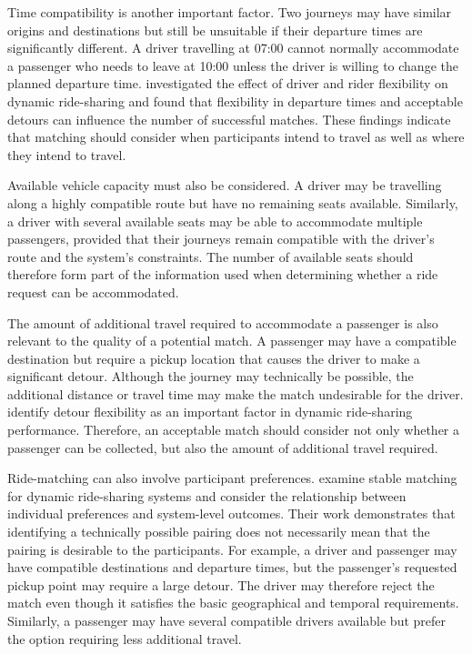 Time compatibility is another important factor. Two journeys may have similar origins and destinations but still be unsuitable if their departure times are significantly different. A driver travelling at 07:00 cannot normally accommodate a passenger who needs to leave at 10:00 unless the driver is willing to change the planned departure time. \citet{stiglic2016} investigated the effect of driver and rider flexibility on dynamic ride-sharing and found that flexibility in departure times and acceptable detours can influence the number of successful matches. These findings indicate that matching should consider when participants intend to travel as well as where they intend to travel.

Available vehicle capacity must also be considered. A driver may be travelling along a highly compatible route but have no remaining seats available. Similarly, a driver with several available seats may be able to accommodate multiple passengers, provided that their journeys remain compatible with the driver's route and the system's constraints. The number of available seats should therefore form part of the information used when determining whether a ride request can be accommodated.

The amount of additional travel required to accommodate a passenger is also relevant to the quality of a potential match. A passenger may have a compatible destination but require a pickup location that causes the driver to make a significant detour. Although the journey may technically be possible, the additional distance or travel time may make the match undesirable for the driver. \citet{stiglic2016} identify detour flexibility as an important factor in dynamic ride-sharing performance. Therefore, an acceptable match should consider not only whether a passenger can be collected, but also the amount of additional travel required.

Ride-matching can also involve participant preferences. \citet{wang2018} examine stable matching for dynamic ride-sharing systems and consider the relationship between individual preferences and system-level outcomes. Their work demonstrates that identifying a technically possible pairing does not necessarily mean that the pairing is desirable to the participants. For example, a driver and passenger may have compatible destinations and departure times, but the passenger's requested pickup point may require a large detour. The driver may therefore reject the match even though it satisfies the basic geographical and temporal requirements. Similarly, a passenger may have several compatible drivers available but prefer the option requiring less additional travel.

